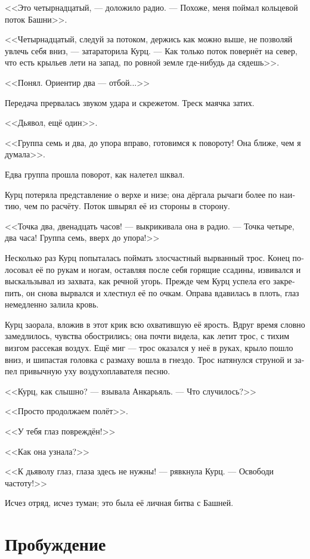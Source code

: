 \documentclass[a4paper,12pt,fleqn]{book}\usepackage{polyglossia}\setdefaultlanguage[babelshorthands=true]{russian}\setotherlanguage{english}\defaultfontfeatures{Ligatures=TeX,Mapping=tex-text}\usepackage{xcolor}\newcommand{\ml}[3]{#2}
\begin{document}
<<Это четырнадцатый, --- доложило радио.
--- Похоже, меня поймал кольцевой поток Башни>>.

<<Четырнадцатый, следуй за потоком, держись как можно выше, не позволяй увлечь себя вниз, --- затараторила Курц.
--- Как только поток повернёт на север, что есть крыльев лети на запад, по ровной земле где-нибудь да сядешь>>.

\ml{$0$}
{<<Понял.}
{``Roger that.}
\ml{$0$}
{Ориентир два --- отбой...>>}
{Beacon two is off---''}

Передача прервалась звуком удара и скрежетом.
Треск маячка затих.

<<Дьявол, ещё один>>.

<<Группа семь и два, до упора вправо, готовимся к повороту!
Она ближе, чем я думала>>.

Едва группа прошла поворот, как налетел шквал.

Курц потеряла представление о верхе и низе;
она дёргала рычаги более по наитию, чем по расчёту.
Поток швырял её из стороны в сторону.

<<Точка два, двенадцать часов! --- выкрикивала она в радио.
--- Точка четыре, два часа!
Группа семь, вверх до упора!>>

Несколько раз Курц попыталась поймать злосчастный вырванный трос.
Конец полосовал её по рукам и ногам, оставляя после себя горящие ссадины, извивался и выскальзывал из захвата, как речной угорь.
Прежде чем Курц успела его закрепить, он снова вырвался и хлестнул её по очкам.
Оправа вдавилась в плоть, глаз немедленно залила кровь.

Курц заорала, вложив в этот крик всю охватившую её ярость.
Вдруг время словно замедлилось, чувства обострились;
она почти видела, как летит трос, с тихим визгом рассекая воздух.
Ещё миг --- трос оказался у неё в руках, крыло пошло вниз, и шипастая головка с размаху вошла в гнездо.
Трос натянулся струной и запел привычную уху воздухоплавателя песню.

<<Курц, как слышно? --- взывала Анкарьяль.
--- Что случилось?>>

<<Просто продолжаем полёт>>.

<<У тебя глаз повреждён!>>

<<Как она узнала?>>

<<К дьяволу глаз, глаза здесь не нужны! --- рявкнула Курц.
--- Освободи частоту!>>

Исчез отряд, исчез туман;
это была её личная битва с Башней.

\section{Пробуждение}
\end{document}
